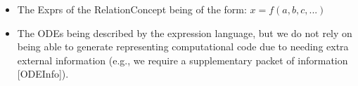\begin{itemize}
\begin{itemize}
              \item The Exprs of the RelationConcept being of the form: $x =
              f(a,b,c,...)$

              \item The ODEs being described by the expression language, but we
                    do not rely on being able to generate representing
                    computational code due to needing extra external information
                    (e.g., we require a supplementary packet of information
                    [ODEInfo]).

          \end{itemize}

\end{itemize}



